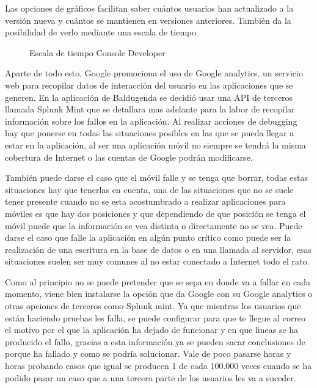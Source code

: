 Las opciones de gráficos facilitan saber cuántos usuarios han actualizado a la versión nueva y cuántos se mantienen en versiones anteriores.
También da la posibilidad de verlo mediante una escala de tiempo


\begin{figure}[H] 
  \begin{center} 
    \caption{Escala de tiempo Console Developer} 
    \label{fig:EscalaTiempo} 
  \end{center} 
\end{figure}

Aparte de todo esto, Google promociona el uso de Google analytics, un servicio web para recopilar datos de interacción del usuario en las aplicaciones que se generen.
En la aplicación de Baldugenda se decidió usar una API de terceros llamada Splunk Mint que se detallara mas adelante para la labor de recopilar información sobre los fallos en la aplicación.
 Al realizar acciones de debugging hay que ponerse en todas las situaciones posibles en las que se pueda llegar a estar en la aplicación, al ser una aplicación móvil no siempre se tendrá la misma cobertura de Internet o las cuentas de Google podrán modificarse.

También puede darse el caso que el móvil falle y se tenga que borrar,  todas estas situaciones hay que tenerlas en cuenta, una de las situaciones que no se suele tener presente cuando no se esta acostumbrado a realizar aplicaciones para móviles es que hay dos posiciones y que dependiendo de que posición se tenga el móvil puede que la información se vea distinta o directamente no se vea.
Puede darse el caso que falle la aplicación en algún punto crítico como puede ser la realización de una escritura en la base de datos o en una llamada al servidor, esas situaciones suelen ser muy comunes al no estar conectado a Internet  todo el rato.

Como al principio no se puede pretender que se sepa en donde va a fallar en cada momento, viene bien instalarse la opción que da Google con su Google analytics o otras opciones de terceros como Splunk mint.
Ya que mientras los usuarios que están haciendo pruebas les falla, se puede configurar para que te llegue al correo el motivo por el que la aplicación ha dejado de funcionar y en que  lineas se ha producido el fallo, gracias a esta información ya se pueden sacar conclusiones de porque ha fallado y como se podría solucionar. Vale de poco pasarse horas y horas probando casos que igual se producen 1 de cada 100.000 veces cuando se ha podido pasar un caso que a una tercera parte de los usuarios les va a suceder.

